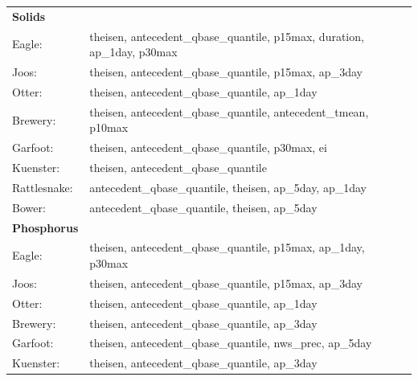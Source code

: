 \documentclass[10pt]{article}
\begin{document}
\begin{table}[h!]\small
    \begin{center}
    \begin{tabular}{ll}
        \textbf{Solids} & \\
        \hspace{5mm} Eagle: & theisen, antecedent\_qbase\_quantile, p15max, duration, ap\_1day, p30max\\
        \hspace{5mm} Joos: & theisen, antecedent\_qbase\_quantile, p15max, ap\_3day\\
        \hspace{5mm} Otter: & theisen, antecedent\_qbase\_quantile, ap\_1day\\
        \hspace{5mm} Brewery: & theisen, antecedent\_qbase\_quantile, antecedent\_tmean, p10max\\
        \hspace{5mm} Garfoot: & theisen, antecedent\_qbase\_quantile, p30max, ei\\
        \hspace{5mm} Kuenster: & theisen, antecedent\_qbase\_quantile\\
        \hspace{5mm} Rattlesnake: & antecedent\_qbase\_quantile, theisen, ap\_5day, ap\_1day \\
        \hspace{5mm} Bower: & antecedent\_qbase\_quantile, theisen, ap\_5day
    \vspace{2mm}\\
        \textbf{Phosphorus} & \\
        \hspace{5mm} Eagle: & theisen, antecedent\_qbase\_quantile, p15max, ap\_1day, p30max\\
        \hspace{5mm} Joos: & theisen, antecedent\_qbase\_quantile, p15max, ap\_3day\\
        \hspace{5mm} Otter: & theisen, antecedent\_qbase\_quantile, ap\_1day\\
        \hspace{5mm} Brewery: & theisen, antecedent\_qbase\_quantile, ap\_3day\\
        \hspace{5mm} Garfoot: & theisen, antecedent\_qbase\_quantile, nws\_prec, ap\_5day\\
        \hspace{5mm} Kuenster: & theisen, antecedent\_qbase\_quantile, ap\_3day\\

\end{tabular}
\end{center}
\end{table}
\end{document}
